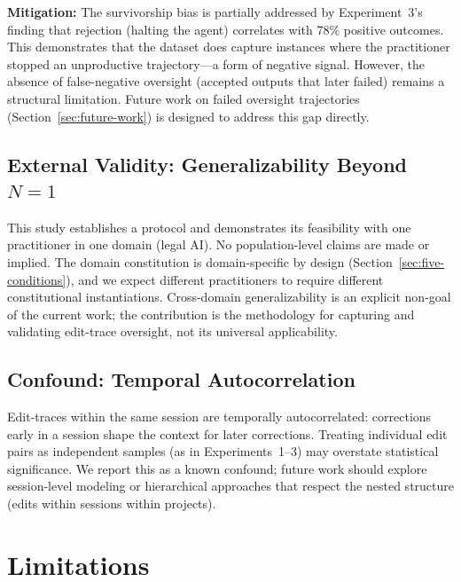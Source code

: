 \documentclass[11pt]{article}
\begin{document}
\textbf{Mitigation:}
The survivorship bias is partially addressed by Experiment~3's finding that rejection (halting the agent) correlates with 78\% positive outcomes.
This demonstrates that the dataset does capture instances where the practitioner stopped an unproductive trajectory---a form of negative signal.
However, the absence of false-negative oversight (accepted outputs that later failed) remains a structural limitation.
Future work on failed oversight trajectories (Section~\ref{sec:future-work}) is designed to address this gap directly.

\subsection{External Validity: Generalizability Beyond $N=1$}

This study establishes a protocol and demonstrates its feasibility with one practitioner in one domain (legal AI).
No population-level claims are made or implied.
The domain constitution is domain-specific by design (Section~\ref{sec:five-conditions}), and we expect different practitioners to require different constitutional instantiations.
Cross-domain generalizability is an explicit non-goal of the current work; the contribution is the methodology for capturing and validating edit-trace oversight, not its universal applicability.

\subsection{Confound: Temporal Autocorrelation}

Edit-traces within the same session are temporally autocorrelated: corrections early in a session shape the context for later corrections.
Treating individual edit pairs as independent samples (as in Experiments~1--3) may overstate statistical significance.
We report this as a known confound; future work should explore session-level modeling or hierarchical approaches that respect the nested structure (edits within sessions within projects).


\section{Limitations}
\label{sec:limitations}
\end{document}
